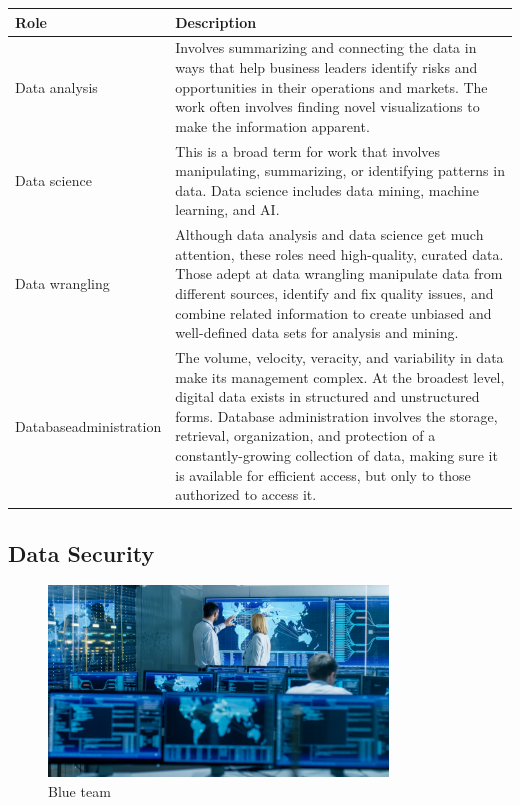 \begin{table}[H]
	\begin{center}
		\begin{tabular}{p{1in}|p{3.4in}} 
			\textbf{Role} & \textbf{Description}\\
			\hline
			Data analysis & Involves summarizing and connecting the data in ways that help business leaders identify risks and opportunities in their operations and markets. The work often involves finding novel visualizations to make the information apparent.\\
			\hline
			Data science & This is a broad term for work that involves manipulating, summarizing, or identifying patterns in data. Data science includes data mining, machine learning, and AI.\\
			\hline
			Data wrangling & Although data analysis and data science get much attention, these roles need high-quality, curated data. Those adept at data wrangling manipulate data from different sources, identify and fix quality issues, and combine related information to create unbiased and well-defined data sets for analysis and mining.\\
			\hline
			Database\linebreak administration & The volume, velocity, veracity, and variability in data make its management complex. At the broadest level, digital data exists in structured and unstructured forms. Database administration involves the storage, retrieval, organization, and protection of a constantly-growing collection of data, making sure it is available for efficient access, but only to those authorized to access it.\\
			\hline
		\end{tabular}
	\end{center}
\end{table}

\subsection{Data Security}

\begin{figure}[H]
	\begin{center}
		\caption{Blue team}
		\vskip 4pt
		\includegraphics[height=2in]{images/careers/iStock-949581032.small.jpg}
	\end{center}
\end{figure}

